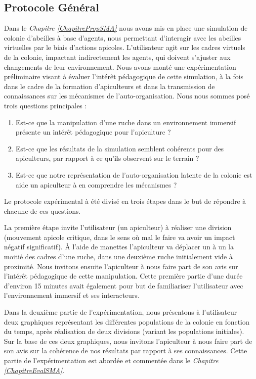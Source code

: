 		\subsection{Protocole Général}
		\label{protocoleGeneral}
		Dans le \textit{Chapitre \ref{ChapitrePropSMA}} nous avons mis en place une simulation de colonie d'abeilles à base d'agents, nous permettant d'interagir avec les abeilles virtuelles par le biais d'actions apicoles. L'utilisateur agit sur les cadres virtuels de la colonie, impactant indirectement les agents, qui doivent s'ajuster aux changements de leur environnement. Nous avons monté une expérimentation préliminaire visant à évaluer l'intérêt pédagogique de cette simulation, à la fois dans le cadre de la formation d'apiculteurs et dans la transmission de connaissances sur les mécanismes de l'auto-organisation. Nous nous sommes posé trois questions principales :
		\begin{enumerate}
			\item Est-ce que la manipulation d'une ruche dans un environnement immersif présente un intérêt pédagogique pour l'apiculture ?
			\item Est-ce que les résultats de la simulation semblent cohérents pour des apiculteurs, par rapport à ce qu'ils observent sur le terrain ?
			\item Est-ce que notre représentation de l'auto-organisation latente de la colonie est aide un apiculteur à en comprendre les mécanismes ?
		\end{enumerate}

    Le protocole expérimental à été divisé en trois étapes dans le but de répondre à chacune de ces questions.
    
    La première étape invite l'utilisateur (un apiculteur) à réaliser une division (mouvement apicole critique, dans le sens où mal le faire va avoir un impact négatif significatif). À l'aide de manettes l'apiculteur va déplacer un à un la moitié des cadres d'une ruche, dans une deuxième ruche initialement vide à proximité. Nous invitons ensuite l'apiculteur à nous faire part de son avis sur l'intérêt pédagogique de cette manipulation. Cette première partie d'une durée d'environ 15 minutes avait également pour but de familiariser l'utilisateur avec l'environnement immersif et ses interacteurs.
    
    Dans la deuxième partie de l'expérimentation, nous présentons à l'utilisateur deux graphiques représentant les différentes populations de la colonie en fonction du temps, après réalisation de deux divisions (variant les populations initiales). Sur la base de ces deux graphiques, nous invitons l'apiculteur à nous faire part de son avis sur la cohérence de nos résultats par rapport à ses connaissances. Cette partie de l'expérimentation est abordée et commentée dans le \textit{Chapitre \ref{ChapitreEvalSMA}}.
    
